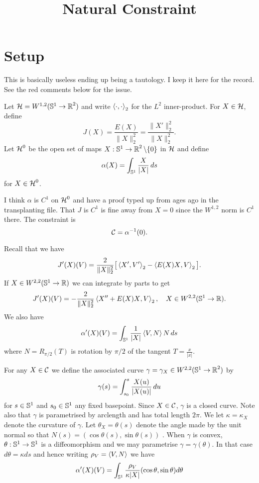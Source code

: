 \documentclass[12pt]{amsart}
\title{Natural Constraint}
\date{}
\begin{document}
\maketitle

\section{Setup}

{\color{red}This is basically useless ending up being a tautology. I keep it here for the record. See the red comments below for the issue.}

Let $\operatorname{\mathcal{H}} = W^{1,2}(\operatorname{\mathbb{S}^1} \to \operatorname{\mathbb{R}}^2)$ and write \(\left\langle{\cdot},{\cdot}\right\rangle_2\) for the \(L^2\) inner-product. For $X \in \operatorname{\mathcal{H}}$, define
\[
J(X) = \frac{E(X)}{\|X\|_2^2} = \frac{\|X'\|_2^2}{\|X\|_2^2}.
\]
Let $\operatorname{{\operatorname{\mathcal{H}}}^0}$ be the open set of maps $X : \operatorname{\mathbb{S}^1} \to \operatorname{\mathbb{R}}^2 \backslash \{0\}$ in \(\operatorname{\mathcal{H}}\) and define
\[
\alpha(X) = \int_{\operatorname{\mathbb{S}^1}} \frac{X}{|X|} \,ds
\]
for \(X \in \operatorname{{\operatorname{\mathcal{H}}}^0}\).

I think $\alpha$ is $C^1$ on $\operatorname{{\operatorname{\mathcal{H}}}^0}$ and have a proof typed up from ages ago in the transplanting file. That $J$ is $C^1$ is fine away from $X = 0$ since the \(W^{1,2}\) norm is \(C^1\) there. The constraint is
\[
\operatorname{\mathcal{C}} = \alpha^{-1} (0).
\]

Recall that we have
\[
J'(X) (V) = \frac{2}{\|X\|_2^2} \big[\left\langle{X'},{V'}\right\rangle_2 - \left\langle{E(X) X},{V}\right\rangle_2\big].
\]
 If \(X \in W^{2,2} (\operatorname{\mathbb{S}^1} \to \operatorname{\mathbb{R}})\) we can integrate by parts to get
\[
J'(X) (V) = -\frac{2}{\|X\|_2^2} \left\langle{X'' + E(X) X},{V}\right\rangle_2, \quad X \in W^{2,2} (\operatorname{\mathbb{S}^1} \to \operatorname{\mathbb{R}}).
\]
We also have
\[
\alpha'(X) (V) = \int_{\operatorname{\mathbb{S}^1}} \frac{1}{|X|} \left\langle{V},{N}\right\rangle N \,ds
\]
where $N = R_{\pi/2} (T)$ is rotation by $\pi/2$ of the tangent $T = \tfrac{x}{|x|}$.

For any $X \in \operatorname{\mathcal{C}}$ we define the associated curve \(\gamma = \gamma_X \in W^{2,2}(\operatorname{\mathbb{S}^1} \to \operatorname{\mathbb{R}}^2)\) by
\[
\gamma (s) = \int_{s_0}^s \frac{X(u)}{|X(u)|} \,du
\]
for \(s \in \operatorname{\mathbb{S}^1}\) and \(s_0 \in \operatorname{\mathbb{S}^1}\) any fixed basepoint. Since \(X \in \operatorname{\mathcal{C}}\), \(\gamma\) is a closed curve. Note also that \(\gamma\) is parametrised by arclength and has total length \(2\pi\). We let \(\kappa = \kappa_X\) denote the curvature of \(\gamma\). Let \(\theta_X = \theta(s)\) denote the angle made by the unit normal so that $N(s) = (\cos\theta(s), \sin\theta(s))$ . When \(\gamma\) is convex, $\theta : \operatorname{\mathbb{S}^1} \to \operatorname{\mathbb{S}^1}$ is a diffeomorphism and we may parametrise $\gamma = \gamma(\theta)$. In that case $d\theta = \kappa ds$ and hence writing $\rho_V = \left\langle{V},{N}\right\rangle$ we have
\[
\alpha'(X) (V) = \int_{\operatorname{\mathbb{S}^1}} \frac{\rho_V}{\kappa|X|} (\cos\theta,\sin\theta) d\theta
\]
\end{document}
